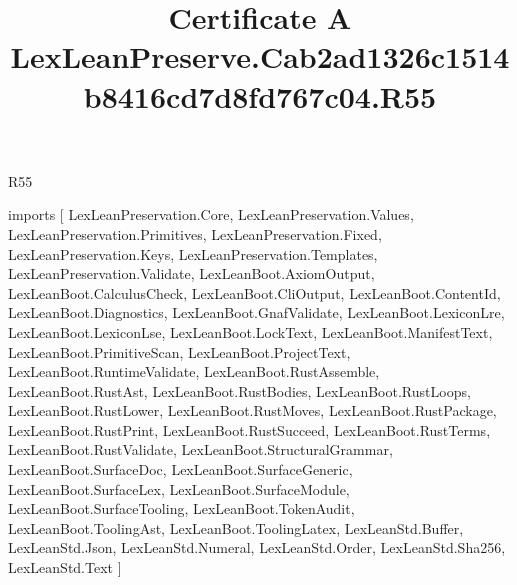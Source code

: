 \begin{lexlean}{R55}
\title{Certificate A LexLeanPreserve.Cab2ad1326c1514b8416cd7d8fd767c04.R55}
\begin{coremodule}
imports [
  LexLeanPreservation.Core,
  LexLeanPreservation.Values,
  LexLeanPreservation.Primitives,
  LexLeanPreservation.Fixed,
  LexLeanPreservation.Keys,
  LexLeanPreservation.Templates,
  LexLeanPreservation.Validate,
  LexLeanBoot.AxiomOutput,
  LexLeanBoot.CalculusCheck,
  LexLeanBoot.CliOutput,
  LexLeanBoot.ContentId,
  LexLeanBoot.Diagnostics,
  LexLeanBoot.GnafValidate,
  LexLeanBoot.LexiconLre,
  LexLeanBoot.LexiconLse,
  LexLeanBoot.LockText,
  LexLeanBoot.ManifestText,
  LexLeanBoot.PrimitiveScan,
  LexLeanBoot.ProjectText,
  LexLeanBoot.RuntimeValidate,
  LexLeanBoot.RustAssemble,
  LexLeanBoot.RustAst,
  LexLeanBoot.RustBodies,
  LexLeanBoot.RustLoops,
  LexLeanBoot.RustLower,
  LexLeanBoot.RustMoves,
  LexLeanBoot.RustPackage,
  LexLeanBoot.RustPrint,
  LexLeanBoot.RustSucceed,
  LexLeanBoot.RustTerms,
  LexLeanBoot.RustValidate,
  LexLeanBoot.StructuralGrammar,
  LexLeanBoot.SurfaceDoc,
  LexLeanBoot.SurfaceGeneric,
  LexLeanBoot.SurfaceLex,
  LexLeanBoot.SurfaceModule,
  LexLeanBoot.SurfaceTooling,
  LexLeanBoot.TokenAudit,
  LexLeanBoot.ToolingAst,
  LexLeanBoot.ToolingLatex,
  LexLeanStd.Buffer,
  LexLeanStd.Json,
  LexLeanStd.Numeral,
  LexLeanStd.Order,
  LexLeanStd.Sha256,
  LexLeanStd.Text
]


\end{coremodule}
\end{lexlean}

